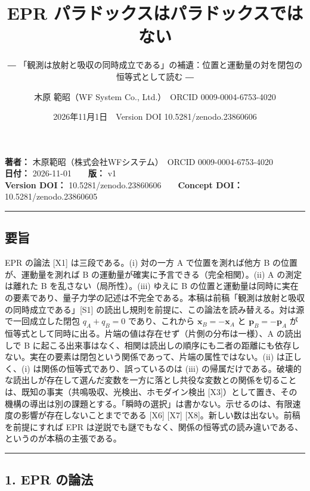 \documentclass[
  a4paper,
]{ltjsarticle}
\title{EPR パラドックスはパラドックスではない}
\subtitle{―
「観測は放射と吸収の同時成立である」の補遺：位置と運動量の対を閉包の恒等式として読む
―}
\author{木原 範昭（WF System Co., Ltd.）　ORCID 0009-0004-6753-4020}
\date{2026年11月1日　Version DOI 10.5281/zenodo.23860606}
\begin{document}
\maketitle

\textbf{著者：} 木原範昭（株式会社WFシステム）　ORCID
0009-0004-6753-4020\\
\textbf{日付：} 2026-11-01　　\textbf{版：} v1\\
\textbf{Version DOI：} 10.5281/zenodo.23860606　　\textbf{Concept DOI：}
10.5281/zenodo.23860605

\begin{center}\rule{0.5\linewidth}{0.5pt}\end{center}

\subsection{要旨}\label{ux8981ux65e8}

EPR の論法 {[}X1{]} は三段である。(i) 対の一方 A で位置を測れば他方 B
の位置が、運動量を測れば B の運動量が確実に予言できる（完全相関）。(ii)
A の測定は離れた B を乱さない（局所性）。(iii) ゆえに B
の位置と運動量は同時に実在の要素であり、量子力学の記述は不完全である。本稿は前稿「観測は放射と吸収の同時成立である」{[}S1{]}
の読出し規則を前提に、この論法を読み替える。対は源で一回成立した閉包
\(q_A+q_B=0\) であり、これから \(\boldsymbol{x}_B=-\boldsymbol{x}_A\) と
\(\boldsymbol{p}_B=-\boldsymbol{p}_A\)
が恒等式として同時に出る。片端の値は存在せず（片側の分布は一様）、A
の読出しで B
に起こる出来事はなく、相関は読出しの順序にも二者の距離にも依存しない。実在の要素は閉包という関係であって、片端の属性ではない。(ii)
は正しく、(i) は関係の恒等式であり、誤っているのは (iii)
の帰属だけである。破壊的な読出しが存在して選んだ変数を一方に落とし共役な変数との関係を切ることは、既知の事実（共鳴吸収、光検出、ホモダイン検出
{[}X3{]}）として置き、その機構の導出は別の課題とする。「瞬時の選択」は書かない。示せるのは、有限速度の影響が存在しないことまでである
{[}X6{]} {[}X7{]} {[}X8{]}。新しい数は出ない。前稿を前提にすれば EPR
は逆説でも謎でもなく、関係の恒等式の読み違いである、というのが本稿の主張である。

\begin{center}\rule{0.5\linewidth}{0.5pt}\end{center}

\subsection{1. EPR の論法}\label{epr-ux306eux8ad6ux6cd5}
\end{document}
